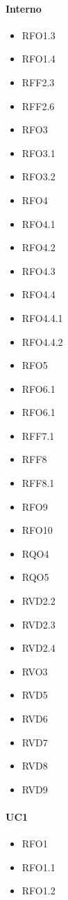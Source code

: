 \paragraph{Interno}
\quad
\begin{multicols}{3}
    \begin{itemize}
        \item RFO1.3
        \item RFO1.4
        \item RFF2.3
        \item RFF2.6
        \item RFO3
        \item RFO3.1
        \item RFO3.2
        \item RFO4
        \item RFO4.1
        \item RFO4.2
        \item RFO4.3
        \item RFO4.4
        \item RFO4.4.1
        \item RFO4.4.2
        \item RFO5
        \item RFO6.1
        \item RFO6.1
        \item RFF7.1
        \item RFF8
        \item RFF8.1
        \item RFO9
        \item RFO10
        \item RQO4
        \item RQO5
        \item RVD2.2
        \item RVD2.3
        \item RVD2.4
        \item RVO3
        \item RVD5
        \item RVD6
        \item RVD7
        \item RVD8
        \item RVD9
    \end{itemize}
\end{multicols}

\paragraph{UC1}
\quad
\begin{multicols}{3}
    \begin{itemize}
        \item RFO1
        \item RFO1.1
        \item RFO1.2
    \end{itemize}
\end{multicols}

